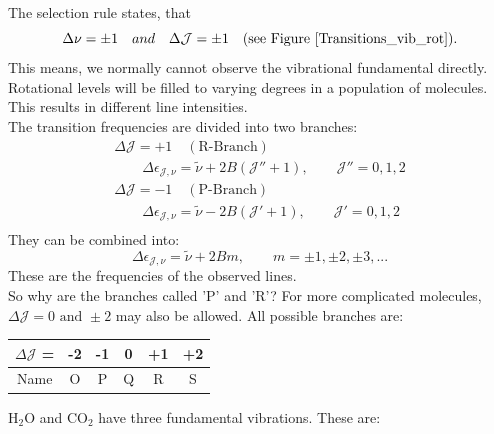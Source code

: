  The selection rule states, that
 \begin{equation}
\Delta \nu = \pm 1 \text \quad {and} \quad \Delta \mathcal{J} = \pm 1 \quad \text{(see Figure \ref{Transitions_vib_rot})}.
\end{equation}
This means, we normally cannot observe the vibrational fundamental directly. Rotational levels will be filled to varying degrees in a population of molecules. This results in different line intensities. \\
The transition frequencies are divided into two branches:
\begin{gather*}
\Delta \mathcal{J} = +1 \quad (\text{R-Branch}) \\
\qquad \Delta \epsilon_{\mathcal{J},\nu} = \tilde{\nu} + 2 B ( \mathcal{J''} + 1), 
	\qquad \mathcal{J''} = 0, 1, 2  \\
\Delta \mathcal{J} = -1 \quad (\text{P-Branch}) \\
\qquad \Delta \epsilon_{\mathcal{J},\nu} = \tilde{\nu} - 2 B ( \mathcal{J'} + 1) , 
	\qquad \mathcal{J'} = 0, 1, 2  \\ 
\end{gather*}
 They can be combined into: 
 \begin{equation}
\Delta \epsilon_{\mathcal{J},\nu} = \tilde{\nu} + 2 B m , 
	\qquad m = \pm1, \pm2, \pm3, ...
\end{equation}
These are the frequencies of the observed lines. \\
So why are the branches called 'P' and 'R'? For more complicated molecules, $\Delta \mathcal{J} = 0 \text{ and } \pm 2$ may also be allowed. All possible branches are:


\begin{center}
\begin{tabular}{|c|c|c|c|c|c|} \hline
$\Delta\mathcal{J}$ = & -2 & -1 & 0 & +1 & +2 \\
\hline
Name & O & P & Q & R & S \\
\hline
\end{tabular}
\end{center}

H$_2$O and CO$_2$ have three fundamental vibrations. These are:

